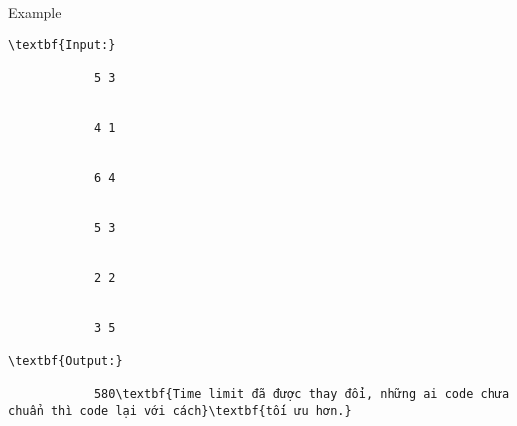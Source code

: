 Example
\begin{verbatim}
\textbf{Input:}

            5 3


            4 1


            6 4


            5 3


            2 2


            3 5

\textbf{Output:}

            580\textbf{Time limit đã được thay đổi, những ai code chưa chuẩn thì code lại với cách}\textbf{tối ưu hơn.}\end{verbatim}